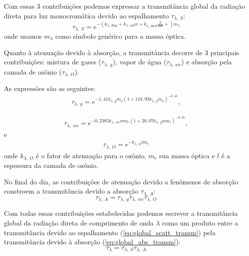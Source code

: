 \documentclass[12pt,a4paper]{article}
\begin{document}
	Com essas 3 contribuições podemos expressar a transmitância global da
	radiação direta para luz monocromática devido ao espalhamento $\tau_{\lambda,\ S}$:
	\begin{equation}%
		\tau_{\lambda,\ S} = e^{-(k_{\lambda,\ Ray} + k_{\lambda,\ wd}w + k_{\lambda,\ dust}\frac{d}{800} + )m_{\lambda}}
		\label{eq:global_scatt_transm}
	\end{equation}
	onde usamos $m_\lambda$ como símbolo genérico para a massa óptica.

	Quanto à atenuação devido à absorção, a transmitância decorre de 3
	principais contribuições: mistura de gases ($\tau_{\lambda,\ g}$),
	vapor de água ($\tau_{\lambda,\ wv}$) e absorção pela camada de ozônio ($\tau_{\lambda,\ O}$). 

	As expressões são as seguintes:
	\begin{eqnarray}%
		\tau_{\lambda,\ g} = e^{-1,41 k_{\lambda,\ g}m_a{(1+118,93 k_{\lambda,\ g}m_a)}^{-0,45}}, 
		\label{eq:gas_mix_absp_transm}
	\end{eqnarray}

	\begin{eqnarray}%
		\tau_{\lambda,\ wv} = e^{-0,2385 k_{\lambda,\ wv}w m_r{(1+20,07 k_{\lambda,\ g}w m_r)}^{-0,45}}, 
		\label{eq:wat_v_absp_transm}
	\end{eqnarray}
	e
	\begin{eqnarray}
		\tau_{\lambda,\ O} = e^{-k_{\lambda,\ O} l m_r}
	\end{eqnarray}
	onde $k_{\lambda,\ O}$ é o fator de atenuação para o ozônio, $m_r$ sua
	massa óptica e $l$ é a espessura da camada de ozônio.

	No final do dia, as contribuições de atenuação devido a fenômenos de absorção constroem 
	a transmitância devido a absorção $\tau_{\lambda,\ A}$:
	\begin{equation}
		\tau_{\lambda,\ A} = \tau_{\lambda,\ g}\tau_{\lambda,\ wv}\tau_{\lambda,\ O} \label{eq:global_abs_transm}
	\end{equation}

	Com todas essas contribuições estabelecidas podemos escrever a transmitância global 
	da radiação direta de comprimento de onda $\lambda$ como um produto entre a transmitância devido 
	ao espalhamento (\ref{eq:global_scatt_transm}) pela transmitância devido à absorção (\ref{eq:global_abs_transm}):
	\begin{equation}
		\tau_{\lambda} = \tau_{\lambda,\ S}\tau_{\lambda,\ A}
	\end{equation}






	
	
\end{document}
